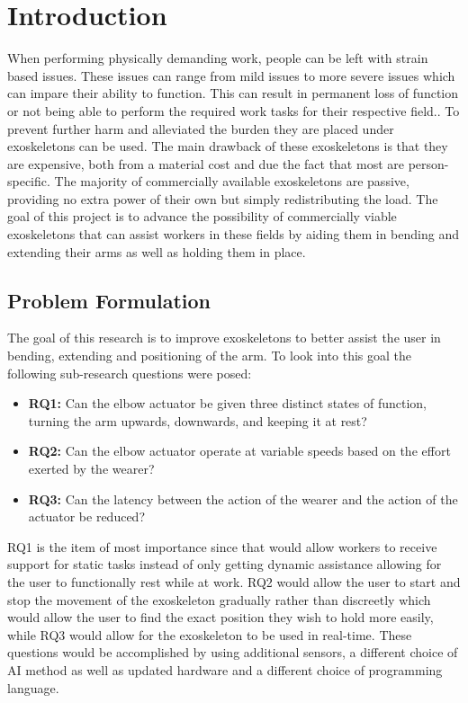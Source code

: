\section{Introduction}
\label{section:intro}

When performing physically demanding work, people can be left with strain based issues. These issues can range from mild issues to more severe issues which can impare their ability to function. 
This can result in permanent loss of function or not being able to perform the required work tasks for their respective field.\cite{WorkDemands}. To prevent further harm and alleviated the burden they are placed under exoskeletons can be used.
The main drawback of these exoskeletons is that they are expensive, both from a material cost and due the fact that most are person-specific. The majority of commercially available 
exoskeletons are passive, providing no extra power of their own but simply redistributing the load. The goal of this 
project is to advance the possibility of commercially viable exoskeletons that can assist workers in these fields by aiding 
them in bending and extending their arms as well as holding them in place.

\subsection{Problem Formulation}
The goal of this research is to improve exoskeletons to better assist the user in bending, extending and positioning of the arm.
To look into this goal the following sub-research questions were posed:
\begin{itemize}
        
    \item \textbf{RQ1:} Can the elbow actuator be given three distinct states of function, turning the arm upwards, downwards, and keeping it at rest?

    \item \textbf{RQ2:} Can the elbow actuator operate at variable speeds based on the effort exerted by the wearer?

    \item \textbf{RQ3:} Can the latency between the action of the wearer and the action of the actuator be reduced?

\end{itemize}
RQ1 is the item of most importance since that would allow workers to receive support for static tasks instead of only getting dynamic
assistance allowing for the user to functionally rest while at work. RQ2 would allow the user to start and stop the
movement of the exoskeleton gradually rather than discreetly which would allow the user to find the exact position they
wish to hold more easily, while RQ3 would allow for the exoskeleton to be used in real-time. These questions would be
accomplished by using additional sensors, a different choice of AI method as well as updated hardware and a different
choice of programming language.\newline


